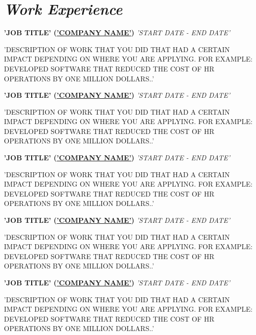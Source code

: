 \documentclass{memoir}
\begin{document}
\section{\textit{Work Experience}}
\vspace{1mm}
\begin{adjustwidth}{0.5cm}{}

    {\textbf{'JOB TITLE' (\href{'COMPANY LINK'}{'COMPANY NAME'})}} \hfill {\textit{'START DATE - END DATE'}}
    \begin{adjustwidth}{0.5cm}{}
       'DESCRIPTION OF WORK THAT YOU DID THAT HAD A CERTAIN IMPACT DEPENDING ON WHERE YOU ARE APPLYING. FOR EXAMPLE: DEVELOPED SOFTWARE THAT REDUCED THE COST OF HR OPERATIONS BY ONE MILLION DOLLARS..'
    \end{adjustwidth}
    \vspace{1.5mm}
    {\textbf{'JOB TITLE' (\href{'COMPANY LINK'}{'COMPANY NAME'})}} \hfill {\textit{'START DATE - END DATE'}}
    \begin{adjustwidth}{0.5cm}{}
       'DESCRIPTION OF WORK THAT YOU DID THAT HAD A CERTAIN IMPACT DEPENDING ON WHERE YOU ARE APPLYING. FOR EXAMPLE: DEVELOPED SOFTWARE THAT REDUCED THE COST OF HR OPERATIONS BY ONE MILLION DOLLARS..'
    \end{adjustwidth}
    \vspace{1.5mm}
    {\textbf{'JOB TITLE' (\href{'COMPANY LINK'}{'COMPANY NAME'})}} \hfill {\textit{'START DATE - END DATE'}}
    \begin{adjustwidth}{0.5cm}{}
       'DESCRIPTION OF WORK THAT YOU DID THAT HAD A CERTAIN IMPACT DEPENDING ON WHERE YOU ARE APPLYING. FOR EXAMPLE: DEVELOPED SOFTWARE THAT REDUCED THE COST OF HR OPERATIONS BY ONE MILLION DOLLARS..'
    \end{adjustwidth}
    \vspace{1.5mm}
    {\textbf{'JOB TITLE' (\href{'COMPANY LINK'}{'COMPANY NAME'})}} \hfill {\textit{'START DATE - END DATE'}}
    \begin{adjustwidth}{0.5cm}{}
      'DESCRIPTION OF WORK THAT YOU DID THAT HAD A CERTAIN IMPACT DEPENDING ON WHERE YOU ARE APPLYING. FOR EXAMPLE: DEVELOPED SOFTWARE THAT REDUCED THE COST OF HR OPERATIONS BY ONE MILLION DOLLARS..'
    \end{adjustwidth}
   {\textbf{'JOB TITLE' (\href{'COMPANY LINK'}{'COMPANY NAME'})}} \hfill {\textit{'START DATE - END DATE'}}
    \begin{adjustwidth}{0.5cm}{}
      'DESCRIPTION OF WORK THAT YOU DID THAT HAD A CERTAIN IMPACT DEPENDING ON WHERE YOU ARE APPLYING. FOR EXAMPLE: DEVELOPED SOFTWARE THAT REDUCED THE COST OF HR OPERATIONS BY ONE MILLION DOLLARS..'
    \end{adjustwidth}
\end{adjustwidth}
\end{document}

